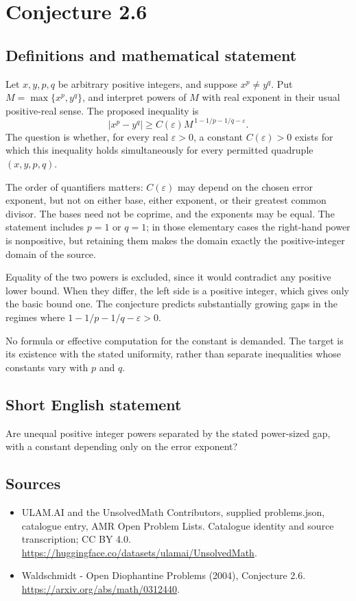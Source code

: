 \documentclass[11pt,a4paper]{article}
\begin{document}
\section*{Conjecture 2.6}\label{statement}

\subsection{Definitions and mathematical statement}
Let $x,y,p,q$ be arbitrary positive integers, and suppose $x^p\ne y^q$. Put $M=\max\{x^p,y^q\}$, and interpret powers of $M$ with real exponent in their usual positive-real sense. The proposed inequality is
\[
|x^p-y^q|\ge C(\varepsilon)
M^{\,1-1/p-1/q-\varepsilon}.
\]
The question is whether, for every real $\varepsilon>0$, a constant $C(\varepsilon)>0$ exists for which this inequality holds simultaneously for every permitted quadruple $(x,y,p,q)$.

The order of quantifiers matters: $C(\varepsilon)$ may depend on the chosen error exponent, but not on either base, either exponent, or their greatest common divisor. The bases need not be coprime, and the exponents may be equal. The statement includes $p=1$ or $q=1$; in those elementary cases the right-hand power is nonpositive, but retaining them makes the domain exactly the positive-integer domain of the source.

Equality of the two powers is excluded, since it would contradict any positive lower bound. When they differ, the left side is a positive integer, which gives only the basic bound one. The conjecture predicts substantially growing gaps in the regimes where $1-1/p-1/q-\varepsilon>0$.

No formula or effective computation for the constant is demanded. The target is its existence with the stated uniformity, rather than separate inequalities whose constants vary with $p$ and $q$.
\subsection{Short English statement}
Are unequal positive integer powers separated by the stated power-sized gap, with a constant depending only on the error exponent?
\subsection{Sources}
\begin{itemize}
\item[S1] ULAM.AI and the UnsolvedMath Contributors, supplied problems.json, catalogue entry, AMR Open Problem Lists. Catalogue identity and source transcription; CC BY 4.0.
\url{https://huggingface.co/datasets/ulamai/UnsolvedMath}.
\item[S2] Waldschmidt - Open Diophantine Problems (2004), Conjecture 2.6. 
\url{https://arxiv.org/abs/math/0312440}.
\end{itemize}
\end{document}
